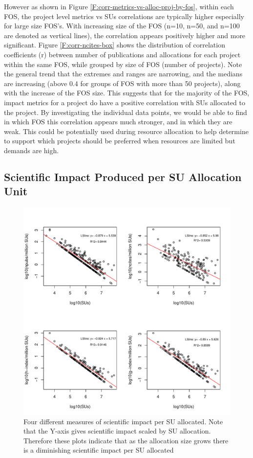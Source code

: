 \documentclass{sig-alternate}
\begin{document}
However as shown in Figure \ref{F:corr-metrics-vs-alloc-proj-by-fos}, within each FOS, the project level metrics vs SUs correlations are typically higher especially for large size FOS's. With increasing size of the FOS (n=10, n=50, and n=100 are denoted as vertical lines), the correlation appears positively higher and more significant. Figure \ref{F:corr-ncites-box} shows the distribution of correlation coefficients (r) between number of publications and allocations for each project within the same FOS, while grouped by size of FOS (number of projects). Note the general trend that the extremes and ranges are narrowing, and the medians are increasing (above 0.4 for groups of FOS with more than 50 projects), along with the increase of the FOS size. This suggests that for the majority of the FOS, impact metrics for a project do have a positive correlation with SUs allocated to the project. By investigating the individual data points, we would be able to find in which FOS this correlation appears much stronger, and in which they are weak. This could be potentially used during resource allocation to help determine to support which projects should be preferred when resources are limited but demands are high.

\subsection{Scientific Impact Produced per SU Allocation Unit} 

\begin{figure}[!htb] 
  \centering 
    \includegraphics[width=1.0\columnwidth]{images/09_roi_projs.pdf} 
  \caption{Four different measures of scientific impact per SU allocated.  Note that the Y-axis gives scientific impact scaled by SU allocation. Therefore these plots indicate that as the allocation size grows there is a diminishing scientific impact per SU allocated}\label{F:projs-roi} 
\end{figure} 
\end{document}
